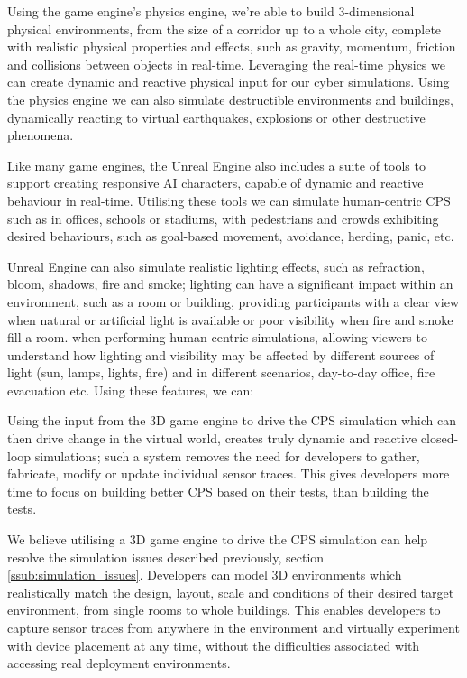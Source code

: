 Using the game engine's physics engine, we're able to build 3-dimensional physical environments, from the size of a corridor up to a whole city, complete with realistic physical properties and effects, such as gravity, momentum, friction and collisions between objects in real-time. Leveraging the real-time physics we can create dynamic and reactive physical input for our cyber simulations. Using the physics engine we can also simulate destructible environments and buildings, dynamically reacting to virtual earthquakes, explosions or other destructive phenomena.

Like many game engines, the Unreal Engine also includes a suite of tools to support creating responsive AI characters, capable of dynamic and reactive behaviour in real-time. Utilising these tools we can simulate human-centric CPS such as in offices, schools or stadiums, with pedestrians and crowds exhibiting desired behaviours, such as goal-based movement, avoidance, herding, panic, etc.

Unreal Engine can also simulate realistic lighting effects, such as refraction, bloom, shadows, fire and smoke; lighting can have a significant impact within an environment, such as a room or building, providing participants with a clear view when natural or artificial light is available or poor visibility when fire and smoke fill a room. when performing human-centric simulations,  allowing viewers to understand how lighting and visibility may be affected by different sources of light (sun, lamps, lights, fire) and in different scenarios, day-to-day office, fire evacuation etc. 
Using these features, we can:


Using the input from the 3D game engine to drive the CPS simulation which can then drive change in the virtual world, creates truly dynamic and reactive closed-loop simulations; such a system removes the need for developers to gather, fabricate, modify or update individual sensor traces. This gives developers more time to focus on building better CPS based on their tests, than building the tests.

We believe utilising a 3D game engine to drive the CPS simulation can help resolve the simulation issues described previously, section \ref{ssub:simulation_issues}. Developers can model 3D environments which realistically match the design, layout, scale and conditions of their desired target environment, from single rooms to whole buildings. This enables developers to capture sensor traces from anywhere in the environment and virtually experiment with device placement at any time, without the difficulties associated with accessing real deployment environments.

